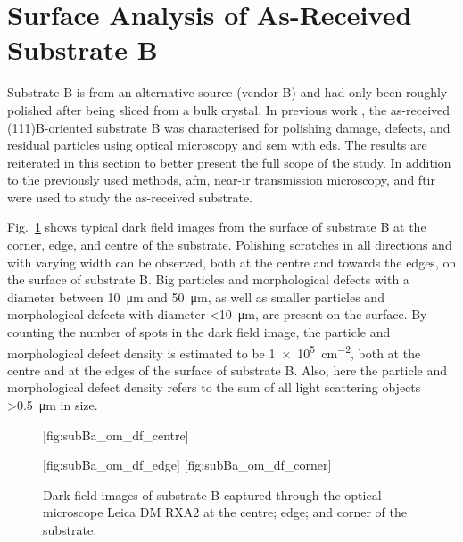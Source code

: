 \clearpage
\section{Surface Analysis of As-Received Substrate B}\label{sec:subBa}
Substrate B is from an alternative source (vendor B) and had only been roughly polished after being sliced from a bulk crystal. In previous work \citep{lauten2017characterisation}, the as-received (111)B-oriented substrate B was characterised for polishing damage, defects, and residual particles using optical microscopy and \ac{sem} with \ac{eds}. The results are reiterated in this section to better present the full scope of the study. In addition to the previously used methods, \ac{afm}, near-\ac{ir} transmission microscopy, and \ac{ftir} were used to study the as-received substrate.

Fig.~\ref{fig:subBa_om_df} shows typical dark field images from the surface of substrate B at the corner, edge, and centre of the substrate. Polishing scratches in all directions and with varying width can be observed, both at the centre and towards the edges, on the surface of substrate B. Big particles and morphological defects with a diameter between \SI{10}{\micro\metre} and \SI{50}{\micro\metre}, as well as smaller particles and morphological defects with diameter \SI{<10}{\micro\metre}, are present on the surface. By counting the number of spots in the dark field image, the particle and morphological defect density is estimated to be \SI{1e5}{\centi\metre^{-2}}, both at the centre and at the edges of the surface of substrate B. Also, here the particle and morphological defect density refers to the sum of all light scattering objects \SI{>0.5}{\micro\metre} in size.

\begin{figure}[htbp]
    \centering
    [fig:subBa_om_df_centre]
    \par\bigskip
    [fig:subBa_om_df_edge]
    \hfill
    [fig:subBa_om_df_corner]
    \caption[Dark field images of substrate B.]{Dark field images of substrate B captured through the optical microscope Leica DM RXA2 at the  centre;  edge; and  corner of the substrate.}
    \label{fig:subBa_om_df}
\end{figure}

